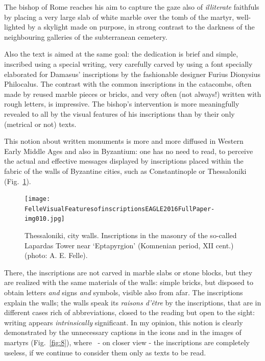 \documentclass[amsthm,ebook]{saparticle}
\begin{document}
The bishop of Rome reaches his aim to capture the gaze also of \emph{illiterate} faithfuls by placing a very large slab of
white marble over the tomb of the martyr, well-lighted by a skylight made on purpose, in strong contrast to the
darkness of the neighbouring galleries of the subterranean cemetery. 

Also the text is aimed at the same goal: the dedication is brief and simple, inscribed using a special writing, very
carefully carved by using a font specially elaborated for Damasus' inscriptions by the fashionable designer Furius
Dionysius Philocalus. The contrast with the common inscriptions in the catacombs, often made by reused marble pieces or
bricks, and very often (not always!) written with rough letters, is impressive. The bishop's intervention is more
meaningfully revealed to all by the visual features of his inscriptions than by their only (metrical or not) texts. 

This notion about written monuments is more and more diffused in Western Early Middle Ages and also in Byzantium: one
has no need to read, to perceive the actual and effective messages displayed by inscriptions placed within the fabric
of the walls of Byzantine cities, such as Constantinople or Thessaloniki (Fig.~\ref{fig:7}).

\begin{figure}[!hbp]
\centering
 \texttt{[image: FelleVisualFeaturesofinscriptionsEAGLE2016FullPaper-img010.jpg]}
\caption{Thessaloniki, city walls. Inscriptions in the masonry of the so-called Lapardas Tower near `Eptapyrgion' (Komnenian period, XII cent.) (photo: A. E. Felle).}
\label{fig:7}
\end{figure}

There, the inscriptions are not carved in marble slabs or stone blocks, but they are realized with the same materials of
the walls: simple bricks, but disposed to obtain letters \emph{and} signs \emph{and} symbols, visible also from afar. The
inscriptions explain the walls; the walls speak its \emph{raisons d'être} by the inscriptions, that are in different cases
rich of abbreviations, closed to the reading but open to the sight: writing appears \emph{intrinsically} significant. In my
opinion, this notion is clearly demonstrated by the unnecessary captions in the icons and in the images of martyrs
(Fig.~\ref{fig:8}), where \ {}- on closer view - the inscriptions are completely useless, if we continue to consider them only as
texts to be read. 
\end{document}
